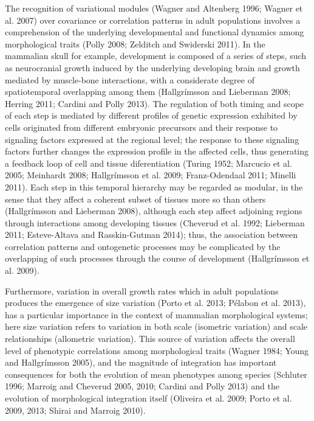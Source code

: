 \documentclass[12pt,]{article}
\begin{document}
The recognition of variational modules (Wagner and Altenberg 1996;
Wagner et al. 2007) over covariance or correlation patterns in adult
populations involves a comprehension of the underlying developmental and
functional dynamics among morphological traits (Polly 2008; Zelditch and
Swiderski 2011). In the mammalian skull for example, development is
composed of a series of steps, such as neurocranial growth induced by
the underlying developing brain and growth mediated by muscle-bone
interactions, with a considerate degree of spatiotemporal overlapping
among them (Hallgrímsson and Lieberman 2008; Herring 2011; Cardini and
Polly 2013). The regulation of both timing and scope of each step is
mediated by different profiles of genetic expression exhibited by cells
originated from different embryonic precursors and their response to
signaling factors expressed at the regional level; the response to these
signaling factors further changes the expression profile in the affected
cells, thus generating a feedback loop of cell and tissue diferentiation
(Turing 1952; Marcucio et al. 2005; Meinhardt 2008; Hallgrímsson et al.
2009; Franz-Odendaal 2011; Minelli 2011). Each step in this temporal
hierarchy may be regarded as modular, in the sense that they affect a
coherent subset of tissues more so than others (Hallgrímsson and
Lieberman 2008), although each step affect adjoining regions through
interactions among developing tissues (Cheverud et al. 1992; Lieberman
2011; Esteve-Altava and Rasskin-Gutman 2014); thus, the association
between correlation patterns and ontogenetic processes may be
complicated by the overlapping of such processes through the course of
development (Hallgrímsson et al. 2009).

Furthermore, variation in overall growth rates which in adult
populations produces the emergence of size variation (Porto et al. 2013;
Pélabon et al. 2013), has a particular importance in the context of
mammalian morphological systems; here size variation refers to variation
in both scale (isometric variation) and scale relationships (allometric
variation). This source of variation affects the overall level of
phenotypic correlations among morphological traits (Wagner 1984; Young
and Hallgrímsson 2005), and the magnitude of integration has important
consequences for both the evolution of mean phenotypes among species
(Schluter 1996; Marroig and Cheverud 2005, 2010; Cardini and Polly 2013)
and the evolution of morphological integration itself (Oliveira et al.
2009; Porto et al. 2009, 2013; Shirai and Marroig 2010).
\end{document}
